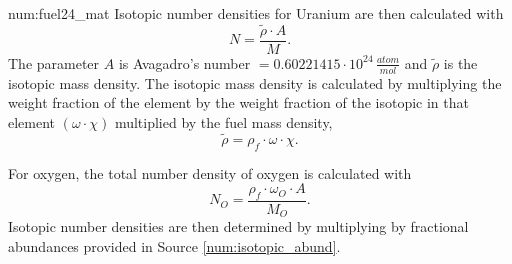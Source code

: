\begin{numitem}{num:fuel24_mat}
Isotopic number densities for Uranium are then calculated with
\[
    N = \frac{\widetilde{\rho} \cdot A}{M}.
\]
The parameter $A$ is Avagadro's number $=0.60221415\cdot 10^{24}\,\frac{atom}{mol}$ and $\widetilde{\rho}$ is the isotopic mass density. The isotopic mass density is calculated by multiplying the weight fraction of the element by the weight fraction of the isotopic in that element $\left(\omega\cdot\chi\right)$ multiplied by the fuel mass density,
\[
  \widetilde{\rho} = \rho_f\cdot \omega \cdot \chi.
\]

For oxygen, the total number density of oxygen is calculated with
\[
    N_O = \frac{\rho_f \cdot \omega_O \cdot A}{M_O}.
\]
Isotopic number densities are then determined by multiplying by fractional abundances provided in Source \ref{num:isotopic_abund}.


\end{numitem}

